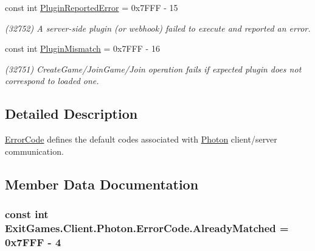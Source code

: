 \begin{DoxyCompactItemize}
const int \hyperlink{class_exit_games_1_1_client_1_1_photon_1_1_error_code_aae1b5ea63ffb0891abe77ebc4aca0e99}{Plugin\+Reported\+Error} = 0x7\+F\+F\+F -\/ 15
\begin{DoxyCompactList}\small\item\em (32752) A server-\/side plugin (or webhook) failed to execute and reported an error. \end{DoxyCompactList}\item 
const int \hyperlink{class_exit_games_1_1_client_1_1_photon_1_1_error_code_a5dedf06ff727b7cd59d0850cc3afd5e9}{Plugin\+Mismatch} = 0x7\+F\+F\+F -\/ 16
\begin{DoxyCompactList}\small\item\em (32751) Create\+Game/\+Join\+Game/\+Join operation fails if expected plugin does not correspond to loaded one. \end{DoxyCompactList}\end{DoxyCompactItemize}


\subsection{Detailed Description}
\hyperlink{class_exit_games_1_1_client_1_1_photon_1_1_error_code}{Error\+Code} defines the default codes associated with \hyperlink{namespace_exit_games_1_1_client_1_1_photon}{Photon} client/server communication. 



\subsection{Member Data Documentation}
\subsubsection[{\texorpdfstring{Already\+Matched}{AlreadyMatched}}]{\setlength{\rightskip}{0pt plus 5cm}const int Exit\+Games.\+Client.\+Photon.\+Error\+Code.\+Already\+Matched = 0x7\+F\+F\+F -\/ 4}\hypertarget{class_exit_games_1_1_client_1_1_photon_1_1_error_code_a434e3c23f618eaad22e1ef1b99c47042}{}\label{class_exit_games_1_1_client_1_1_photon_1_1_error_code_a434e3c23f618eaad22e1ef1b99c47042}
